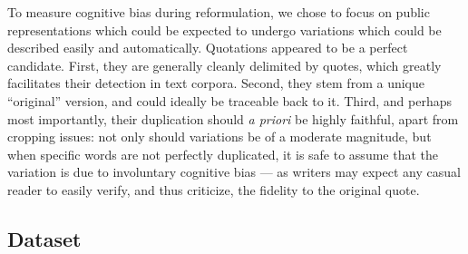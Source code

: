
To measure cognitive bias during reformulation, we chose to focus on public representations which could be expected to undergo variations which could be described easily and automatically.
Quotations appeared to be a perfect candidate. First, they are generally cleanly delimited by quotes, which greatly facilitates their detection in text corpora. Second, they stem from a unique ``original'' version, and could ideally be traceable back to it.
Third, and perhaps most importantly, their duplication should \emph{a priori} be highly faithful, apart from cropping issues: not only should variations be of a moderate magnitude, but when specific words are not perfectly duplicated, it is safe to assume that the variation is due to involuntary cognitive bias --- as writers may expect any casual reader to easily verify, and thus criticize, the fidelity to the original quote.

\subsection{Dataset} %



